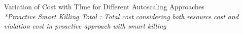 Variation of Cost with TIme for Different Autoscaling Approaches \\
\textit{*Proactive Smart Killing Total : Total cost considering both resource cost and violation cost in proactive approach with smart killing}